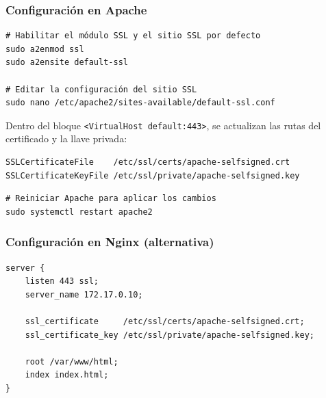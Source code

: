 \documentclass{article}
\renewcommand{\_}{\oldunderscore\hskip0pt\relax}
\begin{document}
\hypertarget{configuraciuxf3n-en-apache}{%
\subsubsection{Configuración en
Apache}\label{configuraciuxf3n-en-apache}}

\begin{Verbatim}[fontsize=\footnotesize,frame=single,rulecolor=\color{codebg},fillcolor=\color{codebg},framesep=2mm,xleftmargin=1mm,xrightmargin=1mm,breaklines=true,breakanywhere=true,breaksymbolleft={},breaksymbolright={}]
# Habilitar el módulo SSL y el sitio SSL por defecto
sudo a2enmod ssl
sudo a2ensite default-ssl

# Editar la configuración del sitio SSL
sudo nano /etc/apache2/sites-available/default-ssl.conf
\end{Verbatim}

Dentro del bloque
\texttt{\textless{}VirtualHost\ \_default\_:443\textgreater{}}, se
actualizan las rutas del certificado y la llave privada:

\begin{Verbatim}[fontsize=\footnotesize,frame=single,rulecolor=\color{codebg},fillcolor=\color{codebg},framesep=2mm,xleftmargin=1mm,xrightmargin=1mm,breaklines=true,breakanywhere=true,breaksymbolleft={},breaksymbolright={}]
SSLCertificateFile    /etc/ssl/certs/apache-selfsigned.crt
SSLCertificateKeyFile /etc/ssl/private/apache-selfsigned.key
\end{Verbatim}

\begin{Verbatim}[fontsize=\footnotesize,frame=single,rulecolor=\color{codebg},fillcolor=\color{codebg},framesep=2mm,xleftmargin=1mm,xrightmargin=1mm,breaklines=true,breakanywhere=true,breaksymbolleft={},breaksymbolright={}]
# Reiniciar Apache para aplicar los cambios
sudo systemctl restart apache2
\end{Verbatim}

\hypertarget{configuraciuxf3n-en-nginx-alternativa}{%
\subsubsection{Configuración en Nginx
(alternativa)}\label{configuraciuxf3n-en-nginx-alternativa}}

\begin{Verbatim}[fontsize=\footnotesize,frame=single,rulecolor=\color{codebg},fillcolor=\color{codebg},framesep=2mm,xleftmargin=1mm,xrightmargin=1mm,breaklines=true,breakanywhere=true,breaksymbolleft={},breaksymbolright={}]
server {
    listen 443 ssl;
    server_name 172.17.0.10;

    ssl_certificate     /etc/ssl/certs/apache-selfsigned.crt;
    ssl_certificate_key /etc/ssl/private/apache-selfsigned.key;

    root /var/www/html;
    index index.html;
}
\end{Verbatim}
\end{document}
